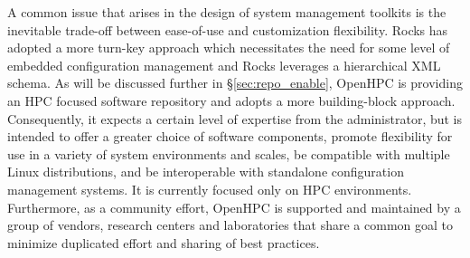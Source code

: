 A common issue that arises in the design of system management toolkits is the
inevitable trade-off between ease-of-use and customization flexibility. Rocks
has adopted a more turn-key approach which necessitates the need for some level
of embedded configuration management and Rocks leverages a hierarchical XML
schema. As will be discussed further in \S\ref{sec:repo_enable}, OpenHPC is
providing an HPC focused software repository and adopts a more building-block
approach. Consequently, it expects a certain level of expertise from the
administrator, but is intended to offer a greater choice of software
components, promote flexibility for use in a variety of system environments
and scales, be compatible with multiple Linux distributions, and be
interoperable with standalone configuration management systems. It is currently 
focused only on HPC environments. Furthermore, as
a community effort, OpenHPC is supported and maintained by a group of vendors,
research centers and laboratories that share a common goal to minimize
duplicated effort and sharing of best practices.
